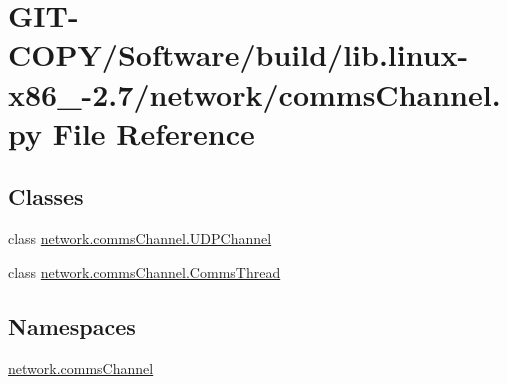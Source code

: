\hypertarget{GIT-COPY_2Software_2build_2lib_8linux-x86__64-2_87_2network_2commsChannel_8py}{}\section{G\+I\+T-\/\+C\+O\+P\+Y/\+Software/build/lib.linux-\/x86\+\_-\/2.7/network/comms\+Channel.py File Reference}
\label{GIT-COPY_2Software_2build_2lib_8linux-x86__64-2_87_2network_2commsChannel_8py}
\subsection*{Classes}
\begin{DoxyCompactItemize}
\item 
class \hyperlink{classnetwork_1_1commsChannel_1_1UDPChannel}{network.\+comms\+Channel.\+U\+D\+P\+Channel}
\item 
class \hyperlink{classnetwork_1_1commsChannel_1_1CommsThread}{network.\+comms\+Channel.\+Comms\+Thread}
\end{DoxyCompactItemize}
\subsection*{Namespaces}
\begin{DoxyCompactItemize}
\item 
 \hyperlink{namespacenetwork_1_1commsChannel}{network.\+comms\+Channel}
\end{DoxyCompactItemize}
